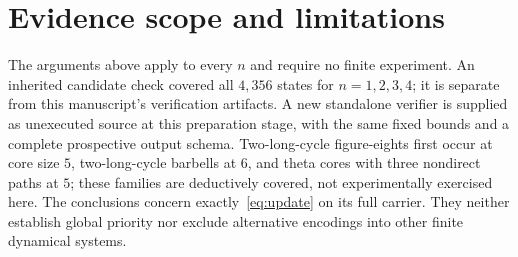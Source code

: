 \section{Evidence scope and limitations}
The arguments above apply to every $n$ and require no finite experiment.
An inherited candidate check covered all $4{,}356$ states for $n=1,2,3,4$;
it is separate from this manuscript's verification artifacts. A new
standalone verifier is supplied as unexecuted source at this preparation
stage, with the same fixed bounds and a complete prospective output schema.
Two-long-cycle figure-eights first occur at core size $5$, two-long-cycle
barbells at $6$, and theta cores with three nondirect paths at $5$; these
families are deductively covered, not experimentally exercised here.
The conclusions concern exactly~\eqref{eq:update} on its full carrier.
They neither establish global priority nor exclude alternative encodings
into other finite dynamical systems.
